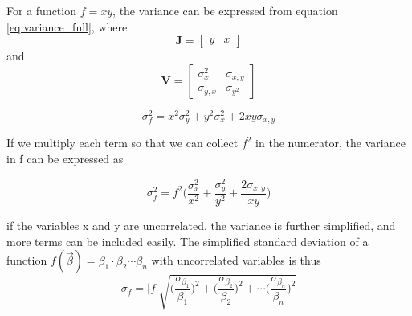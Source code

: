 \documentclass[a4paper,11pt,twoside]{book}
\begin{document}
\noindent 
For a function $f=xy $, the variance can be expressed from equation \ref{eq:variance_full}, where  $$\mathbf{J}=\begin{bmatrix}y & x \end{bmatrix}$$ and $$\mathbf{V}=\begin{bmatrix} \sigma_x^2 & \sigma_{x,y}\\\sigma_{y,x} & \sigma_{y^2} \end{bmatrix}$$ 

\begin{equation}
    \sigma_f^2 = x^2\sigma_y^2 + y^2\sigma_x^2 + 2 xy \sigma_{x,y}
\end{equation}

\noindent If we multiply each term so that we can collect $f^2$ in the numerator, the variance in f can be expressed as 

\begin{equation}
    \sigma_f^2 = f^2 \big( \frac{\sigma_x^2}{x^2} + \frac{\sigma_y^2}{y^2} + \frac{2\sigma_{x,y}}{xy} \Big)
\end{equation}

\noindent if the variables x and y are uncorrelated, the variance is further simplified, and more terms can be included easily. The simplified standard deviation of a function $f(\vec{\beta})=\beta_1 \cdot \beta_2 \cdots \beta_n $ with uncorrelated variables is thus
\begin{equation} \label{eq:uncertainty_simplification}
    \sigma_f = |f|\sqrt{ \Big( \frac{\sigma_{\beta_1}}{\beta_1}\Big)^2 +  \Big( \frac{\sigma_{\beta_2}}{\beta_2}\Big)^2 + \cdots  \Big( \frac{\sigma_{\beta_n}}{\beta_n}\Big)^2    } 
\end{equation}
\end{document}
